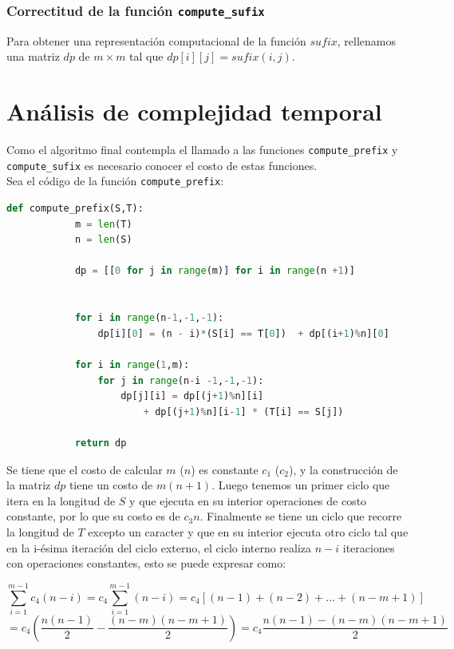 \documentclass[a4paper]{article}
\begin{document}
    \subsubsection*{Correctitud de la funci\'on \texttt{compute\_sufix}}

    Para obtener una representaci\'on computacional de la funci\'on $sufix$,
    rellenamos una matriz $dp$ de $m \times m$ tal que $dp[i][j] = sufix(i,j)$. 

   
    \section*{An\'alisis de complejidad temporal}

    Como el algoritmo final contempla el llamado a las funciones \texttt{compute\_prefix} y \texttt{compute\_sufix}
    es necesario conocer el costo de estas funciones.\\ 

    Sea el c\'odigo de la funci\'on \texttt{compute\_prefix}: 

    \begin{lstlisting}[language=Python]
        def compute_prefix(S,T):
            m = len(T)
            n = len(S)

            dp = [[0 for j in range(m)] for i in range(n +1)]

    
            for i in range(n-1,-1,-1):
                dp[i][0] = (n - i)*(S[i] == T[0])  + dp[(i+1)%n][0] 

            for i in range(1,m):
                for j in range(n-i -1,-1,-1):
                    dp[j][i] = dp[(j+1)%n][i] 
                        + dp[(j+1)%n][i-1] * (T[i] == S[j])

            return dp
    \end{lstlisting}

    Se tiene que el costo de calcular $m$ ($n$) es constante $c_1$ ($c_2$), y la construcci\'on de la matriz $dp$ tiene un costo de 
    $m(n+1)$. Luego tenemos un primer ciclo que itera en la longitud de $S$ y que ejecuta en su interior operaciones de 
    costo constante, por lo que su costo es de $c_3n$. Finalmente se tiene un ciclo que recorre la longitud de $T$ excepto un caracter y que 
    en su interior ejecuta otro ciclo tal que en la i-\'esima iteraci\'on del ciclo externo, el ciclo interno realiza $n-i$ iteraciones con operaciones constantes, esto se puede expresar como:

    $$\sum_{i=1}^{m-1} c_4(n-i) = c_4\sum_{i=1}^{m-1} (n-i) = c_4 [ (n-1) + (n-2) + ... + (n-m +1)] $$ 
    $$ = c_4 \left( \frac{n(n-1)}{2} - \frac{(n-m)(n-m+1)}{2} \right) = c_4 \frac{n(n-1) - (n-m)(n-m+1)}{2} $$
\end{document}
